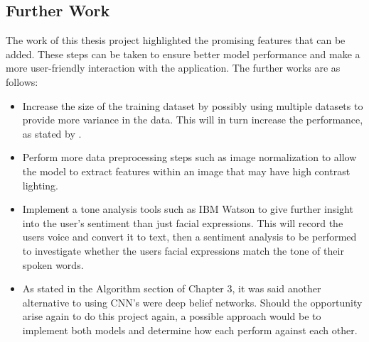 \subsection{Further Work}
The work of this thesis project highlighted the promising features that can be added. These steps can be taken to ensure better model performance and make a more user-friendly interaction with the application. The further works are as follows:
\begin{itemize}
	\item Increase the size of the training dataset by possibly using multiple datasets to provide more variance in the data. This will in turn increase the performance, as stated by \citeauthor{LOPES}.
	\item Perform more data preprocessing steps such as image normalization to allow the model to extract features within an image that may have high contrast lighting.
	\item Implement a tone analysis tools such as IBM Watson to give further insight into the user's sentiment than just facial expressions. This will record the users voice and convert it to text, then a sentiment analysis to be performed to investigate whether the users facial expressions match the tone of their spoken words.
	\item As stated in the Algorithm section of Chapter 3, it was said another alternative to using CNN's were deep belief networks. Should the opportunity arise again to do this project again, a possible approach would be to implement both models and determine how each perform against each other.

\end{itemize}
